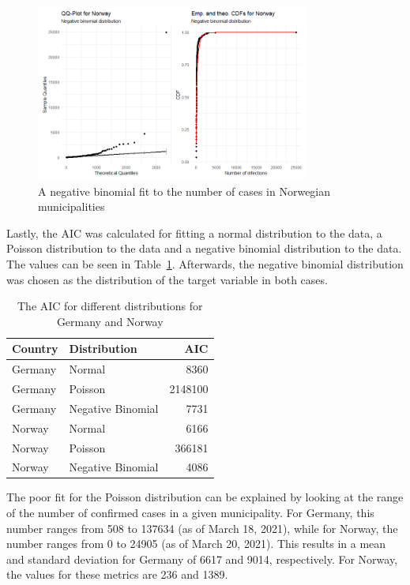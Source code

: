 \begin{figure}[H]
    \centering
    \includegraphics[width = 0.8\textwidth]{fit_nbinom_norway.png}
    \caption{A negative binomial fit to the number of cases in Norwegian municipalities}
    \label{fitNegbinomNorway}
\end{figure}
Lastly, the AIC was calculated for fitting a normal distribution to the data, a Poisson distribution to the data and a negative binomial distribution to the data. The values can be seen in Table~\ref{aic}. Afterwards, the negative binomial distribution was chosen as the distribution of the target variable in both cases. \\
\begin{table}[H] 
\caption{The AIC for different distributions for Germany and Norway \label{aic}}
\begin{tabular}{l l r}
\toprule
\textbf{Country}	& \textbf{Distribution}	& \textbf{AIC} \\
\midrule
Germany & Normal & 8360 \\
Germany & Poisson & 2148100 \\
Germany & Negative Binomial & 7731 \\
Norway & Normal & 6166 \\
Norway & Poisson & 366181 \\
Norway & Negative Binomial & 4086 \\
\bottomrule
\end{tabular}
\end{table} 
The poor fit for the Poisson distribution can be explained by looking at the range of the number of confirmed cases in a given municipality. For Germany, this number ranges from 508 to 137634 (as of March 18, 2021), while for Norway, the number ranges from 0 to 24905 (as of March 20, 2021). This results in a mean and standard deviation for Germany of 6617 and 9014, respectively. For Norway, the values for these metrics are 236 and 1389.

